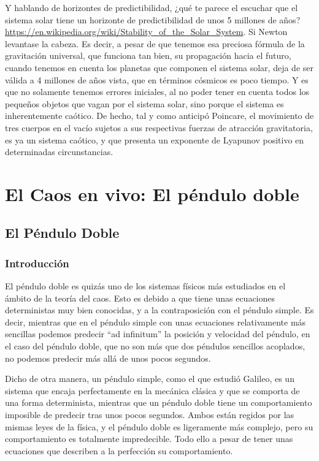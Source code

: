 \documentclass[
  10pt,
  a4paper,
  DIV=11,
  numbers=noendperiod,
  open=any]{scrreprt}
\numberwithin{equation}{chapter}
\numberwithin{equation}{section}
\renewcommand{\[}{\begin{equation}}
\renewcommand{\]}{\end{equation}}
\begin{document}
Y hablando de horizontes de predictibilidad, ¿qué te parece el escuchar
que el sistema solar tiene un horizonte de predictibilidad de unos 5
millones de años? \url{https://en.wikipedia.org/wiki/Stability_of_the_Solar_System}. Si Newton levantase la cabeza. Es decir, a pesar de
que tenemos esa preciosa fórmula de la gravitación universal, que
funciona tan bien, su propagación hacia el futuro, cuando tenemos en
cuenta los planetas que componen el sistema solar, deja de ser válida a
4 millones de años vista, que en términos cósmicos es poco tiempo. Y es
que no solamente tenemos errores iniciales, al no poder tener en cuenta
todos los pequeños objetos que vagan por el sistema solar, sino porque
el sistema es inherentemente caótico. De hecho, tal y como anticipó
Poincare, el movimiento de tres cuerpos en el vacío sujetos a sus
respectivas fuerzas de atracción gravitatoria, es ya un sistema caótico,
y que presenta un exponente de Lyapunov positivo en determinadas
circunstancias.

\part{El Caos en vivo: El péndulo doble}

\chapter{El Péndulo Doble}\label{el-puxe9ndulo-doble}

\section{Introducción}\label{introducciuxf3n-3}

El péndulo doble es quizás uno de los sistemas físicos más estudiados en
el ámbito de la teoría del caos. Esto es debido a que tiene unas
ecuaciones deterministas muy bien conocidas, y a la contraposición con
el péndulo simple. Es decir, mientras que en el péndulo simple con unas
ecuaciones relativamente más sencillas podemos predecir ``ad infinitum''
la posición y velocidad del péndulo, en el caso del péndulo doble, que
no son más que dos péndulos sencillos acoplados, no podemos predecir más
allá de unos pocos segundos.

Dicho de otra manera, un péndulo simple, como el que estudió Galileo, es
un sistema que encaja perfectamente en la mecánica clásica y que se
comporta de una forma determinista, mientras que un péndulo doble tiene
un comportamiento imposible de predecir tras unos pocos segundos. Ambos
están regidos por las mismas leyes de la física, y el péndulo doble es
ligeramente más complejo, pero su comportamiento es totalmente
impredecible. Todo ello a pesar de tener unas ecuaciones que describen a
la perfección su comportamiento.
\end{document}
